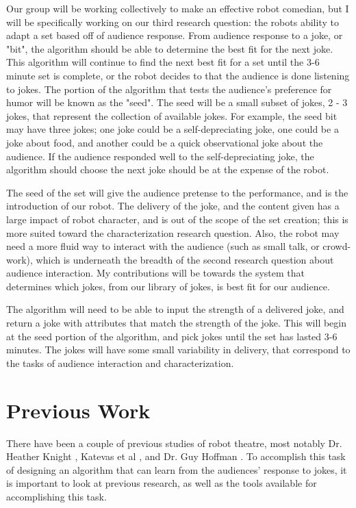 Our group will be working collectively to make an effective robot comedian, but I will be specifically working on our third research question: the robots ability to adapt a set based off of audience response. From audience response to a joke, or "bit", the algorithm should be able to determine the best fit for the next joke. This algorithm will continue to find the next best fit for a set until the 3-6 minute set is complete, or the robot decides to that the audience is done listening to jokes. The portion of the algorithm that tests the audience's preference for humor will be known as the "seed". The seed will be a small subset of jokes, 2 - 3 jokes, that represent the collection of available jokes. For example, the seed bit may have three jokes; one joke could be a self-depreciating joke, one could be a joke about food, and another could be a quick observational joke about the audience. If the audience responded well to the self-depreciating joke, the algorithm should choose the next joke should be at the expense of the robot.

The seed of the set will give the audience pretense to the performance, and is the introduction of our robot. The delivery of the joke, and the content given has a large impact of robot character, and is out of the scope of the set creation; this is more suited toward the characterization research question. Also, the robot may need a more fluid way to interact with the audience (such as small talk, or crowd-work), which is underneath the breadth of the second research question about audience interaction. My contributions will be towards the system that determines which jokes, from our library of jokes, is best fit for our audience.

The algorithm will need to be able to input the strength of a delivered joke, and return a joke with attributes that match the strength of the joke. This will begin at the seed portion of the algorithm, and pick jokes until the set has lasted 3-6 minutes. The jokes will have some small variability in delivery, that correspond to the tasks of audience interaction and characterization.

\section{Previous Work}
    There have been a couple of previous studies of robot theatre, most notably Dr. Heather Knight \cite{KnightEightLessons:2011}, Katevas et al \cite{KatevasRobot:2014}, and Dr. Guy Hoffman \cite{hoffman2010anticipation}. To accomplish this task of designing an algorithm that can learn from the audiences' response to jokes, it is important to look at previous research, as well as the tools available for accomplishing this task.

